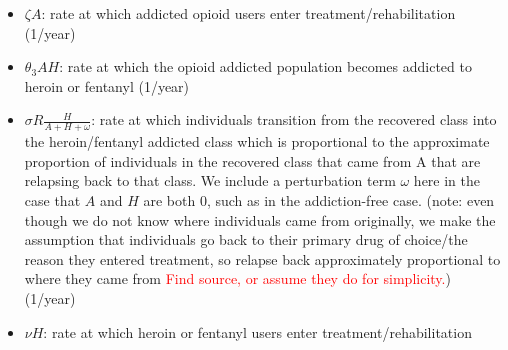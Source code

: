 \documentclass[12pt]{article}
\begin{document}
\begin{itemize}
\item $\zeta A$: rate at which addicted opioid users enter treatment/rehabilitation (1/year)
\item $\theta_3 AH$: rate at which the opioid addicted population becomes addicted to heroin or fentanyl  (1/year)
\item $\sigma R \frac{H}{A+H+\omega}$: rate at which individuals transition from the recovered class into the heroin/fentanyl addicted class which is proportional to the approximate proportion of individuals in the recovered class that came from A that are relapsing back to that class. We include a perturbation term $\omega$ here in the case that $A$ and $H$ are both 0, such as in the addiction-free case. (note: even though we do not know where individuals came from originally, we make the assumption that individuals go back to their primary drug of choice/the reason they entered treatment, so relapse back approximately proportional to where they came from \textcolor{red}{Find source, or assume they do for simplicity.}) (1/year)
\item $\nu H$: rate at which heroin or fentanyl users enter treatment/rehabilitation 
\end{itemize} 
\end{document}
